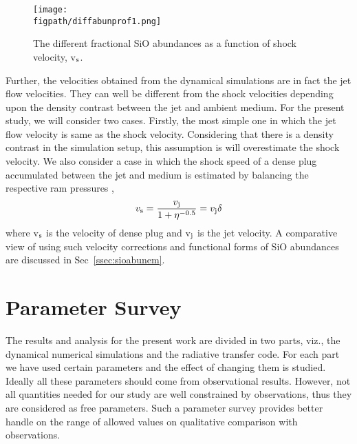 \documentclass[useAMS,usenatbib]{mn2e}
\newcommand{\figpath}{/Users/bhargavvaidya/MyProject/work/Leeds_Uni/SiOJets_New/PAPER/PFIGS/}
\begin{document}
\begin{figure}
 \texttt{[image: \\figpath/diffabunprof1.png]}
 \caption{The different fractional SiO abundances as a function of
   shock velocity, v$_{\rm s}$.}
 \label{abun}
\end{figure}

Further, the velocities obtained from the dynamical simulations are in fact the
jet flow velocities. They can well be different from the shock
velocities depending upon the density contrast between the jet and
ambient medium. For the present study, we will consider two
cases. Firstly, the most simple one in which the jet flow velocity is
same as the shock velocity. Considering that there is a density
contrast in the simulation setup, this assumption is will
overestimate the shock velocity. We also
consider a case in which the shock speed of a dense plug accumulated
between the jet and medium is estimated by balancing the respective ram
pressures \citep{Masson:1993p9661},
\begin{equation}
\label{eq:shockjetvel}
v_{\rm s} = \frac{v_{\rm j}}{1 + \eta^{-0.5}} = v_{\rm j}\delta
\end{equation}
where v$_{\rm s}$ is the velocity of dense plug and v$_{\rm j}$ is the
jet velocity. A comparative view of using such velocity corrections and
functional forms of SiO abundances are discussed in
Sec~\ref{ssec:sioabunem}.

    







\section{Parameter Survey}
\label{sec:parasurvey}
The results and analysis for the present work are divided in two parts,
viz., the dynamical numerical simulations and the
radiative transfer code. For each part we have used certain parameters
and the effect of changing them is studied. Ideally all these parameters should come from observational
results. However, not all quantities needed for our study are well
constrained by observations, thus they are considered as
free parameters. Such a parameter survey provides better handle on the range of allowed
values on qualitative comparison with observations. 
%
\end{document}

